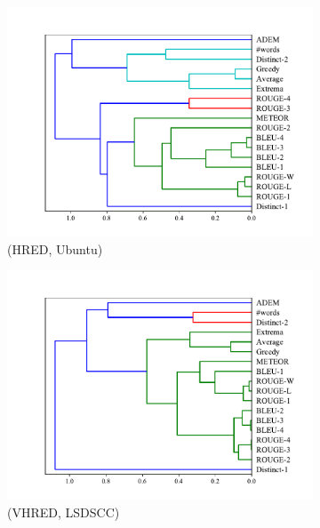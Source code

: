 \begin{figure}[htb]
\begin{subfigure}{0.33\linewidth}
        \centering
        \includegraphics[width=\linewidth]{figure/plot/hierarchy/v2/pearson/hred/ubuntu/plot.pdf}
        \caption{(HRED, Ubuntu)}
    \end{subfigure}
    \begin{subfigure}{0.33\linewidth}
        \centering
        \includegraphics[width=\linewidth]{figure/plot/hierarchy/v2/pearson/vhred/lsdscc/plot.pdf}
        \caption{(VHRED, LSDSCC)}
    \end{subfigure}%
    \begin{subfigure}{0.33\linewidth}
        \centering

\end{subfigure}
\end{figure}
